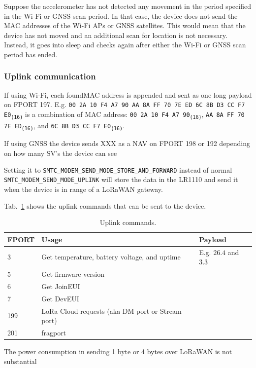 Suppose the accelerometer has not detected any movement in the period specified in the Wi-Fi or GNSS scan period. In that case, the device does not send the \ac{MAC} addresses of the Wi-Fi \ac{AP}s or \ac{GNSS} satellites. This would mean that the device has not moved and an additional scan for location is not necessary. Instead, it goes into sleep and checks again after either the Wi-Fi or \ac{GNSS} scan period has ended.

\subsubsection{Uplink communication}
If using Wi-Fi, each found\ac{MAC} address is appended and sent as one long payload on \ac{FPORT} 197. E.g. \texttt{00 2A 10 F4 A7 90 AA 8A FF 70 7E ED 6C 8B D3 CC F7 E0\textsubscript{(16)}} is a combination of \ac{MAC} address: \texttt{00 2A 10 F4 A7 90\textsubscript{(16)}}, \texttt{AA 8A FF 70 7E ED\textsubscript{(16)}}, and \texttt{6C 8B D3 CC F7 E0\textsubscript{(16)}}.

If using \ac{GNSS} the device sends XXX as a \ac{NAV} on \ac{FPORT} 198 or 192 depending on how many \ac{SV}'s the device can see

Setting it to \lstinline[style=C++]{SMTC_MODEM_SEND_MODE_STORE_AND_FORWARD} instead of normal \lstinline[style=C++]{SMTC_MODEM_SEND_MODE_UPLINK} will store the data in the LR1110 and send it when the device is in range of a \ac{LoRaWAN} gateway.

Tab.~\ref{tab:uplink_commands} shows the uplink commands that can be sent to the device.

\begin{table}[H]
\centering
\caption{Uplink commands.}
\label{tab:uplink_commands}
\begin{tabular}{l|l|l}
\ac{FPORT} & Usage & Payload \\ \hline
3 & Get temperature, battery voltage, and uptime & E.g. $26.4$ and $3.3$ \\
5 & Get firmware version & \\
6 & Get \ac{JoinEUI} & \\
7 & Get \ac{DevEUI} & \\
199 & LoRa Cloud requests (aka DM port or Stream port) & \\
201 & fragport & \\
\end{tabular}
\end{table}

The power consumption in sending 1 byte or 4 bytes over \ac{LoRaWAN} is not substantial


